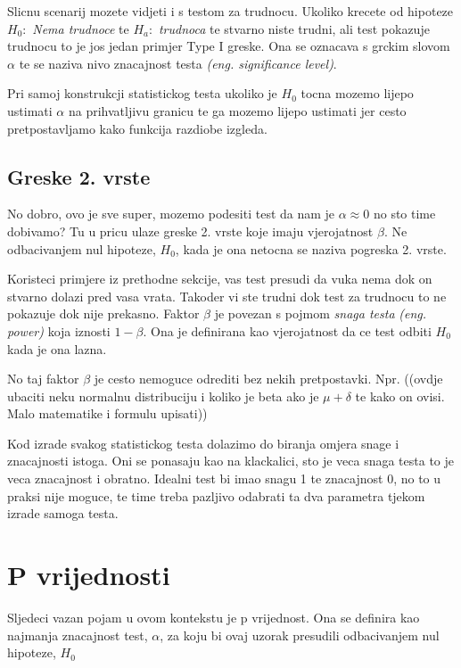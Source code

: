Slicnu scenarij mozete vidjeti i s testom za trudnocu. Ukoliko krecete od hipoteze  $H_0:$ \emph{Nema trudnoce} te $H_a:$ \emph{trudnoca} te stvarno niste trudni, ali test pokazuje trudnocu to je jos jedan primjer Type I greske. Ona se oznacava s grckim slovom $\alpha$ te se naziva nivo znacajnost testa \textit{(eng. significance level)}.

Pri samoj konstrukcji statistickog testa ukoliko je $H_0$ tocna mozemo lijepo ustimati $\alpha$ na prihvatljivu granicu te ga mozemo lijepo ustimati jer cesto pretpostavljamo kako funkcija razdiobe izgleda. 

\subsection{Greske 2. vrste}

No dobro, ovo je sve super, mozemo podesiti test da nam je $\alpha \approx 0$ no sto time dobivamo? Tu u pricu ulaze greske 2. vrste koje imaju vjerojatnost $\beta$. Ne odbacivanjem nul hipoteze, $H_0$, kada je ona netocna se naziva pogreska 2. vrste. \cite{engstat}

Koristeci primjere iz prethodne sekcije, vas test presudi da vuka nema dok on stvarno dolazi pred vasa vrata. Takoder vi ste trudni dok test za trudnocu to ne pokazuje dok nije prekasno. Faktor $\beta$ je povezan s pojmom \emph{snaga testa} \textit{(eng. power)} koja iznosti $1-\beta$. Ona je definirana kao vjerojatnost da ce test odbiti $H_0$ kada je ona lazna. 

No taj faktor $\beta$ je cesto nemoguce odrediti bez nekih pretpostavki. Npr. ((ovdje ubaciti neku normalnu distribuciju i koliko je beta ako je $\mu  + \delta$ te kako on ovisi. Malo matematike i formulu upisati))

Kod izrade svakog statistickog testa dolazimo do biranja omjera snage i znacajnosti istoga. Oni se ponasaju kao na klackalici, sto je veca snaga testa to je veca znacajnost i obratno. Idealni test bi imao snagu 1 te znacajnost 0, no to u praksi nije moguce, te time treba pazljivo odabrati ta dva parametra tjekom izrade samoga testa.

\section{P vrijednosti}
Sljedeci vazan pojam u ovom kontekstu je p vrijednost. Ona se definira kao najmanja znacajnost test, $\alpha$, za koju bi ovaj uzorak presudili odbacivanjem nul hipoteze, $H_0$ \cite{engstat}

